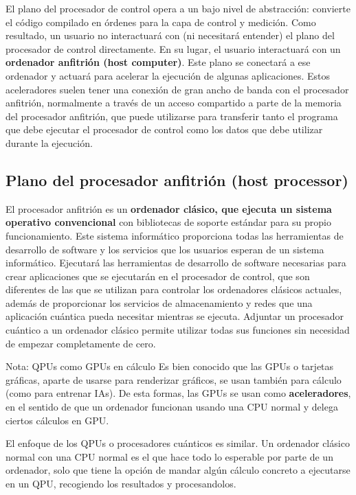 El plano del procesador de control opera a un bajo nivel de abstracción: convierte el código compilado en órdenes para la capa de control y medición. Como resultado, un usuario no interactuará con (ni necesitará entender) el plano del procesador de control directamente. En su lugar, el usuario interactuará con un \textbf{ordenador anfitrión (host computer)}. Este plano se conectará a ese ordenador y actuará para acelerar la ejecución de algunas aplicaciones.  Estos aceleradores suelen tener una conexión de gran ancho de banda con el procesador anfitrión, normalmente a través de un acceso compartido a parte de la memoria del procesador anfitrión, que puede utilizarse para transferir tanto el programa que debe ejecutar el procesador de control como los datos que debe utilizar durante la ejecución.


	\subsection{Plano del procesador anfitrión (host processor)}



El procesador anfitrión es un \textbf{ordenador clásico, que ejecuta un sistema operativo convencional} con bibliotecas de soporte estándar para su propio funcionamiento. Este sistema informático proporciona todas las herramientas de desarrollo de software y los servicios que los usuarios esperan de un sistema informático. Ejecutará las herramientas de desarrollo de software necesarias para crear aplicaciones que se ejecutarán en el procesador de control, que son diferentes de las que se utilizan para controlar los ordenadores clásicos actuales, además de proporcionar los servicios de almacenamiento y redes que una aplicación cuántica pueda necesitar mientras se ejecuta. Adjuntar un procesador cuántico a un ordenador clásico permite utilizar todas sus funciones sin necesidad de empezar completamente de cero.

\begin{mybox_blue}{Nota: QPUs como GPUs en cálculo}
Es bien conocido que las GPUs o tarjetas gráficas, aparte de usarse para renderizar gráficos, se usan también para cálculo (como para entrenar IAs). De esta formas, las GPUs se usan como \textbf{aceleradores}, en el sentido de que un ordenador funcionan usando una CPU normal y delega ciertos cálculos en GPU. 
\vspace{0.3cm}

El enfoque de los QPUs o procesadores cuánticos es similar. Un ordenador clásico normal con una CPU normal es el que hace todo lo esperable por parte de un ordenador, solo que tiene la opción de mandar algún cálculo concreto a ejecutarse en un QPU, recogiendo los resultados y procesandolos.
\end{mybox_blue}


